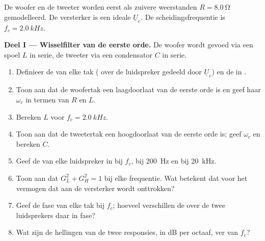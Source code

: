 \begin{problem}
\label{pb:b1:filters-transfer-functions:1}
De woofer en de tweeter worden eerst als zuivere weerstanden
$R = \qty{8.0}{\ohm}$ gemodelleerd. De versterker is een ideale 
$\underline U_e$. De scheidingsfrequentie is $f_c = \qty{2.0}{kHz}$.

\medskip
\noindent\textbf{Deel I --- Wisselfilter van de eerste orde.}
De woofer wordt gevoed via een spoel $L$ in serie, de tweeter via een
condensator $C$ in serie.
\begin{enumerate}
  \item Definieer de  van elke tak ( over de
        luidspreker gedeeld door $\underline U_e$) en de  in .
  \item Toon aan dat de woofertak een laagdoorlaat van de eerste orde is en geef
        haar  $\omega_c$ in termen van $R$ en $L$.
  \item Bereken $L$ voor $f_c = \qty{2.0}{kHz}$.
  \item Toon aan dat de tweetertak een hoogdoorlaat van de eerste orde is; geef
        $\omega_c$ en bereken $C$.
  \item Geef de  van elke luidspreker in  bij $f_c$, bij \qty{200}{Hz}
        en bij \qty{20}{kHz}.
  \item Toon aan dat $G_L^2 + G_H^2 = 1$ bij elke frequentie. Wat betekent
        dat voor het vermogen dat aan de versterker wordt onttrokken?
  \item Geef de fase van elke tak bij $f_c$; hoeveel verschillen de 
        over de twee luidsprekers daar in fase?
  \item Wat zijn de hellingen van de twee responsies, in dB per octaaf, ver
        van $f_c$?
\end{enumerate}


\end{problem}
